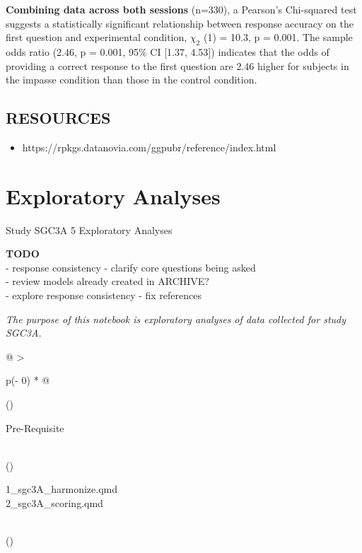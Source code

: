 \documentclass[
  letterpaper,
  DIV=11,
  numbers=noendperiod]{scrreprt}
\providecommand{\tightlist}{%
  \setlength{\itemsep}{0pt}\setlength{\parskip}{0pt}}\usepackage{longtable,booktabs,array}
\begin{document}
\textbf{Combining data across both sessions} (n=330), a Pearson's
Chi-squared test suggests a statistically significant relationship
between response accuracy on the first question and experimental
condition, \(\chi_2\) (1) = 10.3, p = 0.001. The sample odds ratio
(2.46, p = 0.001, 95\% CI {[}1.37, 4.53{]}) indicates that the odds of
providing a correct response to the first question are 2.46 higher for
subjects in the impasse condition than those in the control condition.

\hypertarget{resources-3}{%
\section{RESOURCES}\label{resources-3}}

\begin{itemize}
\tightlist
\item
  https://rpkgs.datanovia.com/ggpubr/reference/index.html
\end{itemize}

\hypertarget{sec-SGC3A-exploration}{%
\chapter{Exploratory Analyses}\label{sec-SGC3A-exploration}}

Study SGC3A \textbar{} 5 Exploratory Analyses

\hfill\break

\newpage

\textbf{TODO}\\
- response consistency - clarify core questions being asked\\
- review models already created in ARCHIVE?\\
- explore response consistency - fix references

\emph{The purpose of this notebook is exploratory analyses of data
collected for study SGC3A.}

\begin{longtable}[]{@{}
  >{\raggedright\arraybackslash}p{(\columnwidth - 0\tabcolsep) * }@{}}
\toprule()
\begin{minipage}[b]{\linewidth}\raggedright
Pre-Requisite
\end{minipage} \\
\midrule()
\endhead
\begin{minipage}[t]{\linewidth}\raggedright
1\_sgc3A\_harmonize.qmd\\
2\_sgc3A\_scoring.qmd\strut
\end{minipage} \\
\bottomrule()
\end{longtable}
\end{document}

